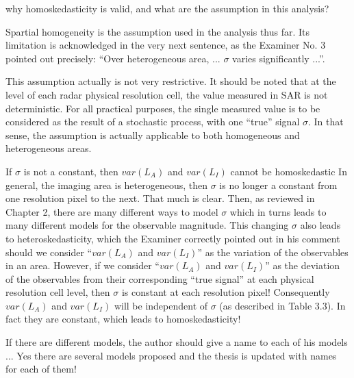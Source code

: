 \replyToComment
    {why homoskedasticity is valid, and what are the assumption in this analysis?}
    {Spartial homogeneity is the assumption used in the analysis thus far. 
Its limitation is acknowledged in the very next sentence, as the Examiner No. 3 pointed out precisely: ``Over heterogeneous area, ... $\sigma$ varies significantly ...''.

This assumption actually is not very restrictive.
It should be noted that at the level of each radar physical resolution cell, 
  the value measured in SAR is not deterministic.
For all practical purposes, the single measured value is to be considered as the result of a stochastic process, with one ``true'' signal $\sigma$.
In that sense, the assumption is actually applicable to both homogeneous and heterogeneous areas.
}

\replyToComment
    {If $\sigma$ is not a constant, then $var(L_A)$ and $var(L_I)$ cannot be homoskedastic}
    {In general, the imaging area is heterogeneous, then $\sigma$ is no longer a constant from one resolution pixel to the next.
That much is clear.
Then, as reviewed in Chapter 2, there are many different ways to model $\sigma$ which in turns leads to many different models for the observable magnitude.
This changing $\sigma$ also leads to heteroskedasticity, 
  which the Examiner correctly pointed out in his comment
  should we consider ``$var(L_A)$ and $var(L_I)$'' as the variation of the observables in an area.
However, if we consider ``$var(L_A)$ and $var(L_I)$'' as the deviation of the observables from their corresponding ``true signal'' at each physical resolution cell level, 
  then $\sigma$ is constant at each resolution pixel!
Consequently $var(L_A)$ and $var(L_I)$ will be independent of $\sigma$ (as described in Table 3.3).
In fact they are constant, which leads to homoskedasticity!
}

\replyToComment
    {If there are different models, the author should give a name to each of his models ...}
    {Yes there are several models proposed and the thesis is updated with names for each of them!}

